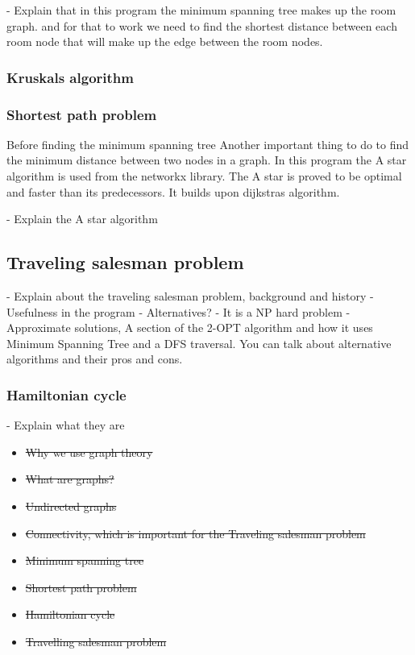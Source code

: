 - Explain that in this program the minimum spanning tree makes up the room graph. and for that to work we need to find the shortest distance between each room node that will make up the edge between the room nodes.

\subsubsection{Kruskals algorithm}

\subsubsection{Shortest path problem}
Before finding the minimum spanning tree Another important thing to do to find the minimum distance between two nodes in a graph.
In this program the A star algorithm is used from the networkx library. The A star is proved to be optimal and faster than its predecessors. It builds upon dijkstras algorithm.

- Explain the A star algorithm



\subsection{Traveling salesman problem}

- Explain about the traveling salesman problem, background and history
- Usefulness in the program
- Alternatives?
- It is a NP hard problem
- Approximate solutions, A section of the 2-OPT algorithm and how it uses Minimum Spanning Tree and a DFS traversal. You can talk about alternative algorithms and their pros and cons. \cite{flood1956traveling}


\subsubsection{Hamiltonian cycle}
- Explain what they are 

\begin{itemize}
    \item \sout{Why we use graph theory}
    \item \sout{What are graphs?}
    \item \sout{Undirected graphs}
    \item \sout{Connectivity, which is important for the Traveling salesman problem}
    \item \sout{Minimum spanning tree}
    \item \sout{Shortest path problem}
    \item \sout{Hamiltonian cycle}
    \item \sout{Travelling salesman problem}
\end{itemize}



